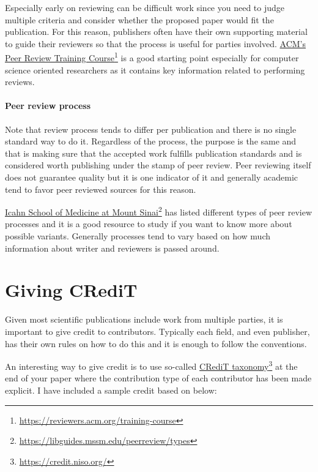 Especially early on reviewing can be difficult work since you need to judge multiple criteria and consider whether the proposed paper would fit the publication.
For this reason, publishers often have their own supporting material to guide their reviewers so that the process is useful for parties involved.
\href{https://reviewers.acm.org/training-course}{ACM's Peer Review Training Course}\footnote{\url{https://reviewers.acm.org/training-course}} is a good starting point especially for computer science oriented researchers as it contains key information related to performing reviews.

\paragraph{Peer review process}

Note that review process tends to differ per publication and there is no single standard way to do it.
Regardless of the process, the purpose is the same and that is making sure that the accepted work fulfills publication standards and is considered worth publishing under the stamp of peer review.
Peer reviewing itself does not guarantee quality but it is one indicator of it and generally academic tend to favor peer reviewed sources for this reason.

\href{https://libguides.mssm.edu/peerreview/types}{Icahn School of Medicine at Mount Sinai}\footnote{\url{https://libguides.mssm.edu/peerreview/types}} has listed different types of peer review processes and it is a good resource to study if you want to know more about possible variants.
Generally processes tend to vary based on how much information about writer and reviewers is passed around.

\section{Giving CRediT}

Given most scientific publications include work from multiple parties, it is important to give credit to contributors.
Typically each field, and even publisher, has their own rules on how to do this and it is enough to follow the conventions.

An interesting way to give credit is to use so-called \href{https://credit.niso.org/}{CRediT taxonomy}\footnote{\url{https://credit.niso.org/}} at the end of your paper where the contribution type of each contributor has been made explicit. I have included a sample credit based on \citet{elsevierCRediTAuthor} below:

